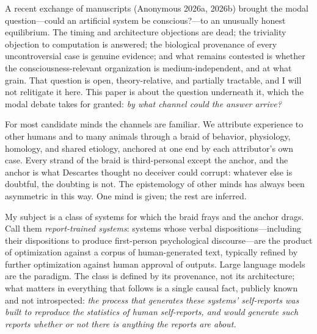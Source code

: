 \documentclass[11pt]{article}
\begin{document}
A recent exchange of manuscripts (Anonymous 2026a, 2026b) brought the modal question---could an artificial system be conscious?---to an unusually honest equilibrium. The timing and architecture objections are dead; the triviality objection to computation is answered; the biological provenance of every uncontroversial case is genuine evidence; and what remains contested is whether the consciousness-relevant organization is medium-independent, and at what grain. That question is open, theory-relative, and partially tractable, and I will not relitigate it here. This paper is about the question underneath it, which the modal debate takes for granted: \emph{by what channel could the answer arrive?}

For most candidate minds the channels are familiar. We attribute experience to other humans and to many animals through a braid of behavior, physiology, homology, and shared etiology, anchored at one end by each attributor's own case. Every strand of the braid is third-personal except the anchor, and the anchor is what Descartes thought no deceiver could corrupt: whatever else is doubtful, the doubting is not. The epistemology of other minds has always been asymmetric in this way. One mind is given; the rest are inferred.

My subject is a class of systems for which the braid frays and the anchor drags. Call them \emph{report-trained systems}: systems whose verbal dispositions---including their dispositions to produce first-person psychological discourse---are the product of optimization against a corpus of human-generated text, typically refined by further optimization against human approval of outputs. Large language models are the paradigm. The class is defined by its provenance, not its architecture; what matters in everything that follows is a single causal fact, publicly known and not introspected: \emph{the process that generates these systems' self-reports was built to reproduce the statistics of human self-reports, and would generate such reports whether or not there is anything the reports are about.}
\end{document}
